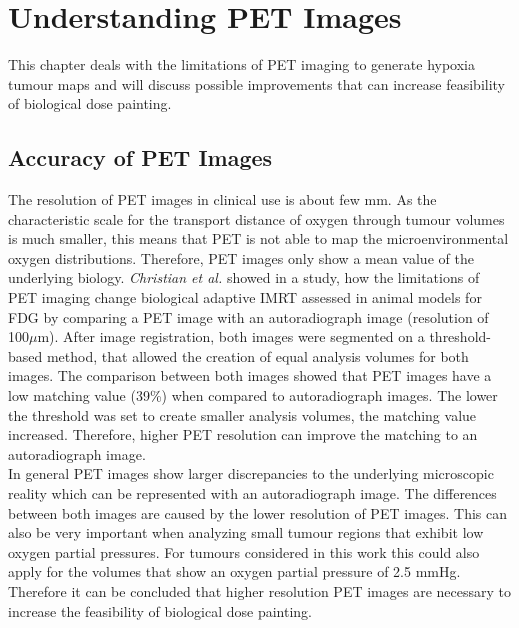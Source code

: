 
\section{Understanding PET Images}
This chapter deals with the limitations of PET imaging to generate hypoxia tumour maps and will discuss possible improvements that can increase feasibility of biological dose painting.
\subsection{Accuracy of PET Images}\label{chap:petaccuracy}
The resolution of PET images in clinical use is about few mm. As the characteristic scale for the transport distance of oxygen through tumour volumes is much smaller, this means that PET is not able to map the microenvironmental oxygen distributions. Therefore, PET images only show a mean value of the underlying biology. \textit{Christian et al.} \cite{pmid19097661, pmid19293465} showed in a study, how the limitations of PET imaging change biological adaptive IMRT assessed in animal models for FDG by comparing a PET image with an autoradiograph image (resolution of 100$\mu$m). After image registration, both images were segmented on a threshold-based method, that allowed the creation of equal analysis volumes for both images. The comparison between both images showed that PET images have a low matching value (39\%) when compared to autoradiograph images. The lower the threshold was set to create smaller analysis volumes, the matching value increased. Therefore, higher PET resolution can improve the matching to an autoradiograph image.\\In general PET images show larger discrepancies to the underlying microscopic reality which can be represented with an autoradiograph image. The differences between both images are caused by the lower resolution of PET images. This can also be very important when analyzing small tumour regions that exhibit low oxygen partial pressures. For tumours considered in this work this could also apply for the volumes that show an oxygen partial pressure of 2.5 mmHg. Therefore it can be concluded that higher resolution PET images are necessary to increase the feasibility of biological dose painting.
